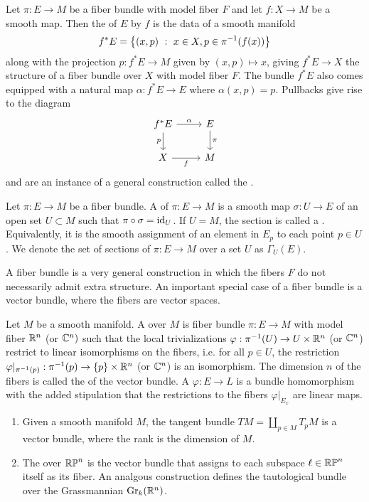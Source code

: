 \begin{defn}
Let $\pi : E \to M$ be a fiber bundle with model fiber $F$
and let $f : X \to M$ be a smooth map. Then the  of $E$ by $f$ is
the data of a smooth manifold
\[
f^*E = \left\lbrace (x, p)~:~ x \in X, p \in \pi^{-1}(f(x))  \right\rbrace
\]
along with the projection $p : f^*E \to M$ given by $(x,p) \mapsto x$, giving
$f^*E \to X$ the structure of a fiber bundle over $X$ with model fiber $F$.
The bundle $f^*E$ also comes equipped with a natural map $\alpha : f^*E \to E$
where $\alpha(x,p) = p$. Pullbacks give rise to the diagram
\[\begin{tikzcd}
f^*E \ar[d, "p"']\ar[r, "\alpha"] & E \ar[d, "\pi"] \\
X \ar[r, "f"']& M
\end{tikzcd}\]
and are an instance of a general construction called the .
\end{defn}
%
\begin{defn}
Let $\pi : E \to M$ be a fiber bundle. A  of $\pi : E \to M$
is a smooth map $\sigma : U \to E$ of an open set $U \subset M$ such that
$\pi \circ \sigma = \operatorname{id}_U$. If $U = M$, the section is called a .
Equivalently, it is the smooth assignment of an element in $E_p$ to each point
$p \in U$. We denote the set of sections of $\pi : E \to M$ over a set $U$
as $\Gamma_U(E)$.
\end{defn}
%
A fiber bundle is a very general construction in which the fibers $F$ do
not necessarily admit extra structure. An important special case of a fiber bundle
is a vector bundle, where the fibers are vector spaces.
%
\begin{defn}
Let $M$ be a smooth manifold. A  over $M$ is fiber bundle
$\pi : E \to M$ with model fiber $\mathbb{R}^n$ (or $\mathbb{C}^n)$ such that the local
trivializations $\varphi : \pi^{-1}(U) \to U \times \mathbb{R}^n$ (or $\mathbb{C}^n$)
restrict to linear isomorphisms on the fibers, i.e. for all $p \in U$, the restriction
$\varphi\vert_{\pi^{-1}(p)} : \pi^{-1}(p) \to \left\lbrace p \right\rbrace \times \mathbb{R}^n$
(or $\mathbb{C}^n$) is an isomorphism. The dimension $n$ of the fibers is called the
 of the vector bundle. A 
$\varphi : E \to L$ is a bundle homomorphism with the added stipulation that
the restrictions to the fibers $\varphi\vert_{E_x}$ are linear maps.
\end{defn}
%
\begin{exmp} \enumbreak
\begin{enumerate}
  \item Given a smooth manifold $M$, the tangent bundle $TM = \coprod_{p \in M} T_pM$
  is a vector bundle, where the rank is the dimension of $M$.
  \item The  over $\mathbb{RP}^n$ is the vector bundle that
  assigns to each subspace $\ell \in \mathbb{RP}^n$ itself as its fiber. An analgous
  construction defines the tautological bundle over the Grassmannian
  $\mathrm{Gr}_k(\mathbb{R}^n)$.
\end{enumerate}
\end{exmp}
